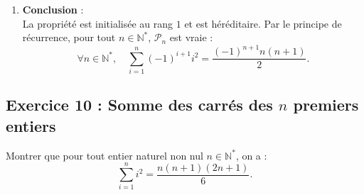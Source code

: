 \documentclass[11pt,a4paper]{article}
\newcommand{\N}{\mathbb{N}}
\begin{document}
\begin{correctionbox}
\begin{enumerate}[label=\textbf{\arabic*.}]
    \item \textbf{Conclusion} :\\
    La propriété est initialisée au rang $1$ et est héréditaire. Par le principe de récurrence, pour tout $n \in \N^*$, $\mathcal{P}_n$ est vraie :
    \[
    \forall n \in \N^*, \quad \sum_{i=1}^n (-1)^{i+1} i^2 = \frac{(-1)^{n+1} n(n+1)}{2}.
    \]
\end{enumerate}
\end{correctionbox}

\subsection*{Exercice 10 : Somme des carrés des $n$ premiers entiers}

Montrer que pour tout entier naturel non nul $n \in \N^*$, on a :
\[
\sum_{i=1}^n i^2 = \frac{n(n+1)(2n+1)}{6}.
\]
\end{document}
